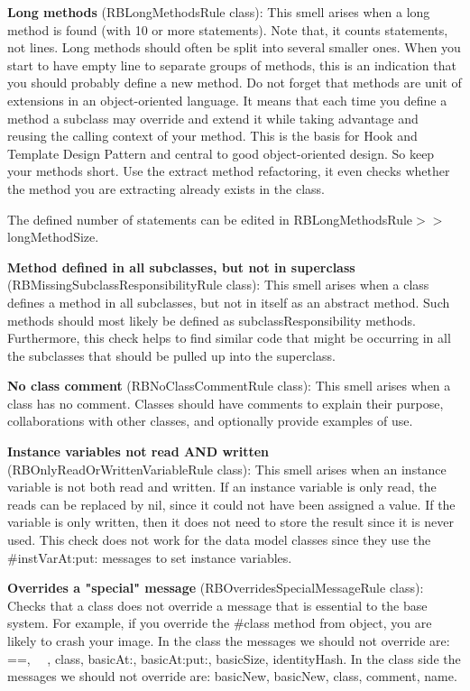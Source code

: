\textbf{Long methods} (RBLongMethodsRule class): This smell arises when a long method is found (with 10 or more statements). Note that, it counts statements, not lines. Long methods should often be split into several smaller ones. When you start to have empty line to separate groups of methods, this is an indication that you should probably define a new method. 
	Do not forget that methods are unit of extensions in an object-oriented language. It means that each time you define a method a subclass may override and extend it while taking advantage and reusing the calling context of your method. This is the basis for Hook and Template Design Pattern and central to good object-oriented design. So keep your methods short. 
	Use the extract method refactoring, it even checks whether the method you are extracting already exists in the class. 
	
	The defined number of statements can be edited in RBLongMethodsRule$>>$longMethodSize.

\textbf{Method defined in all subclasses, but not in superclass} (RBMissingSubclassResponsibilityRule class): This smell arises when a class defines a method in all subclasses, but not in itself as an abstract method. Such methods should most likely be defined as subclassResponsibility methods. Furthermore, this check helps to find similar code that might be occurring in all the subclasses that should be pulled up into the superclass.

\textbf{No class comment} (RBNoClassCommentRule class): This smell arises when a class has no comment. Classes should have comments to explain their purpose, collaborations with other classes, and optionally provide examples of use.

\textbf{Instance variables not read AND written} (RBOnlyReadOrWrittenVariableRule class): This smell arises when an instance variable is not both read and written. If an instance variable is only read, the reads can be replaced by nil, since it could not have been assigned a value. If the variable is only written, then it does not need to store the result since it is never used. This check does not work for the data model classes since they use the \#instVarAt:put: messages to set instance variables.

\textbf{Overrides a "special" message} (RBOverridesSpecialMessageRule class): Checks that a class does not override a message that is essential to the base system. For example, if you override the \#class method from object, you are likely to crash your image.
In the class the messages we should not override are: ==, ~~, class, basicAt:, basicAt:put:, basicSize, identityHash.
In the class side the messages we should not override are: basicNew, basicNew, class, comment, name.

